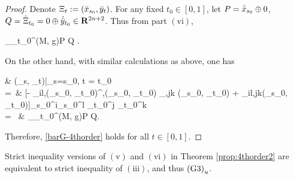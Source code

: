 \begin{proof}
		Denote $\Xi_{t} := (\bar{x}_{s_0}, \bar{y}_t)$. For any fixed $t_0 \in [0,1]$, let $P = \dot{\bar{x}}_{s_0} \oplus 0$, $Q = \dot{\Xi}_{t_0} = 0 \oplus \dot{\bar{y}}_{t_0} \in {\mathbf R}^{2n+2}$. Thus from part $\mathrm{(vi)}$, 
		\begin{flalign}
			 \sec_{\Xi_{t_0}}^{(M, g)}P \wedge Q
			 .
		\end{flalign}
		On the other hand, with similar calculations as above, one has
		\begin{flalign}
		& \barG(\barx_s, \bary_t)\Bigg|_{s=s_0, t = t_0} \\
		=\ & [- \barG_{il,\alpha}(\barx_{s_0}, \bary_{t_0})\cdot \barG^{\beta,\alpha}(\barx_{s_0}, \bary_{t_0}) \cdot \barG_{\beta,jk} (\barx_{s_0}, \bary_{t_0}) + \barG_{il,jk}(\barx_{s_0}, \bary_{t_0})]\cdot \dot{\barx}_{s_0}^{i}\cdot\dot{\barx}_{s_0}^{l} \cdot\dot{\bary}_{t_0}^{j} \cdot \dot{\bary}_{t_0}^{k}\\
		= \ & \sec_{\Xi_{t_0}}^{(M, g)}P \wedge Q.
		\end{flalign}
	Therefore, \eqref{barG-4thorder} holds for all $t \in [0,1]$.
\end{proof}



\begin{remark}
	Strict inequality versions of $\mathrm{(v)}$ and $\mathrm{(vi)}$ in Theorem \ref{prop:4thorder2} are equivalent to strict inequality of $\mathrm{(iii)}$, and thus ${\rm (G3)}_{u}$.
\end{remark}

%
